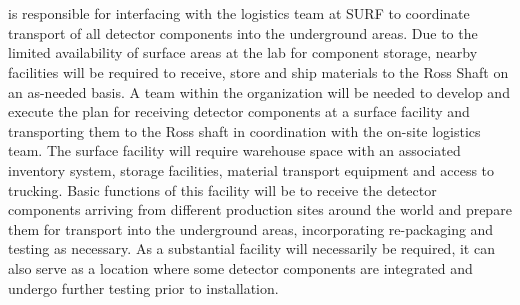 \section{}
\label{sec:fdsp-coord-integ-test}

  is responsible for interfacing with the
 logistics team at SURF to coordinate transport of all
detector components into the underground areas.  Due to the limited
availability of surface areas at the lab for component storage, nearby
facilities will be required to receive, store and ship materials to
the Ross Shaft on an as-needed basis. A team within the 
organization will be needed to develop and execute the plan for
receiving detector components at a surface facility and transporting
them to the Ross shaft in coordination with the on-site 
logistics team.  The surface facility will require warehouse space
with an associated inventory system, storage facilities, material
transport equipment and access to trucking.  Basic functions of this
facility will be to receive the detector components arriving from
different production sites around the world and prepare them for
transport into the underground areas, incorporating re-packaging and
testing as necessary. As a substantial facility will necessarily be
required, it can also serve as a location where some detector
components are integrated and undergo further testing prior to
installation.

